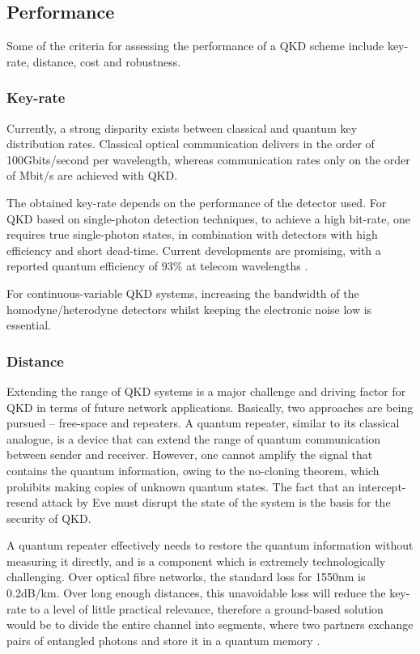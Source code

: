 \subsection{Performance}

Some of the criteria for assessing the performance of a QKD scheme include key-rate, distance, cost and robustness.

\subsubsection{Key-rate}

Currently, a strong disparity exists between classical and quantum key distribution rates. Classical optical communication delivers in the order of 100Gbits/second per wavelength, whereas communication rates only on the order of Mbit/s are achieved with QKD.

The obtained key-rate depends on the performance of the detector used. For QKD based on single-photon detection techniques, to achieve a high bit-rate, one requires true single-photon states, in combination with detectors with high efficiency and short dead-time. Current developments are promising, with a reported quantum efficiency of $93\%$ at telecom wavelengths \cite{bib:marsili2013detecting}.

For continuous-variable QKD systems, increasing the bandwidth of the homodyne/heterodyne detectors whilst keeping the electronic noise low is essential.

\subsubsection{Distance}

Extending the range of QKD systems is a major challenge and driving factor for QKD in terms of future network applications. Basically, two approaches are being pursued -- free-space and repeaters. A quantum repeater, similar to its classical analogue, is a device that can extend the range of quantum communication between sender and receiver. However, one cannot amplify the signal that contains the quantum information, owing to the no-cloning theorem, which prohibits making copies of unknown quantum states. The fact that an intercept-resend attack by Eve must disrupt the state of the system is the basis for the security of QKD.

A quantum repeater effectively needs to restore the quantum information without measuring it directly, and is a component which is extremely technologically challenging. Over optical fibre networks, the standard loss for 1550nm is 0.2dB/km. Over long enough distances, this unavoidable loss will reduce the key-rate to a level of little practical relevance, therefore a ground-based solution would be to divide the entire channel into segments, where two partners exchange pairs of entangled photons and store it in a quantum memory \cite{bib:PhysRevLett.81.5932, bib:PhysRevA.59.169}.

